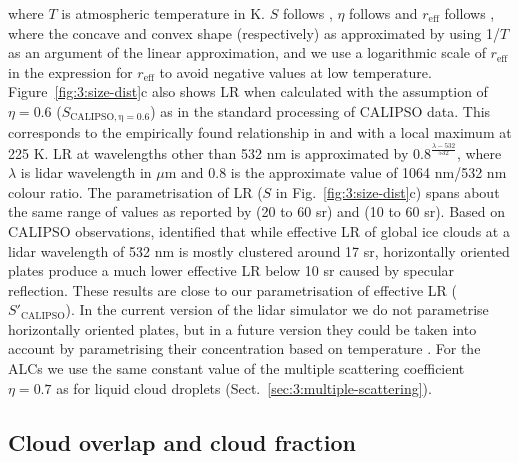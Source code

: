\noindent where $T$ is atmospheric temperature in K. $S$ follows
\cite[Figure 12b]{garnier2015},
$\eta$ follows \cite[Figure 9a]{garnier2015} and $r_\text{eff}$ follows \cite[Figure 2]{heymsfield2005},
where the concave and convex shape (respectively) as approximated by using
1/$T$ as an argument of the linear approximation, and we use a logarithmic scale of $r_\mathrm{eff}$ in
the expression for $r_\text{eff}$ to avoid negative values at low temperature.
Figure~\ref{fig:3:size-dist}c also shows LR when calculated with the assumption of $\eta = 0.6$
($S_\mathrm{CALIPSO,\eta=0.6}$)
as in the standard processing of CALIPSO data. This corresponds to the
empirically found relationship in \cite[Figure 12a]{garnier2015} and
\cite[Figure 9]{josset2012} with a local maximum at 225 K. LR at wavelengths other than 532 nm
is approximated by $0.8^\frac{\lambda - 532}{532}$, where $\lambda$ is lidar
wavelength
in $\mu$m and 0.8 is the approximate value of 1064 nm/532 nm colour ratio. The parametrisation of LR ($S$ in Fig.~\ref{fig:3:size-dist}c) spans about
the same range of values as reported by
\cite[Figure 5.6]{hopkin2018} (20 to 60 sr) and \cite{yorks2011} (10 to 60 sr).
Based on CALIPSO observations,
\cite{hu2007a} identified that while effective LR of global
ice clouds at a lidar wavelength of 532 nm is mostly clustered around 17 sr,
horizontally oriented plates produce a much lower effective LR below
10 sr caused by specular reflection.
These results are close to our parametrisation of effective LR
($S'_\text{CALIPSO}$).
In the current version of the lidar simulator we do not parametrise
horizontally oriented plates, but in a future version they could be taken into
account by parametrising their concentration based on temperature \citep{noel2010}.
For the ALCs we use the same constant value of the multiple
scattering coefficient $\eta = 0.7$ as for liquid cloud droplets
(Sect.~\ref{sec:3:multiple-scattering}).

\subsection{Cloud overlap and cloud fraction}

